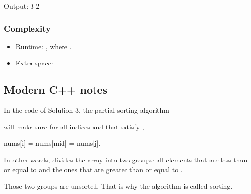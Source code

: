 \documentclass[letterpaper,12pt,english]{book}
\begin{document}
\begin{sphinxVerbatim}[commandchars=\\\{\}]
Output:
3
2
\end{sphinxVerbatim}


\subsubsection{Complexity}
\label{\detokenize{Sorting/04_SORT_169_Majority_Element:id3}}\begin{itemize}
\item {} 
\sphinxAtStartPar
Runtime: , where .

\item {} 
\sphinxAtStartPar
Extra space: .

\end{itemize}


\subsection{Modern C++ notes}
\label{\detokenize{Sorting/04_SORT_169_Majority_Element:modern-c-notes}}
\sphinxAtStartPar
In the code of Solution 3, the partial sorting algorithm %
\begin{footnote}[80]\sphinxAtStartFootnote
{}
%
\end{footnote} will make sure for all indices  and  that satisfy ,

\begin{sphinxVerbatim}[commandchars=\\\{\}]
nums[i] \PYGZlt{}= nums[mid] \PYGZlt{}= nums[j].
\end{sphinxVerbatim}

\sphinxAtStartPar
In other words,  divides the array  into two groups: all elements that are less than or equal to  and the ones that are greater than or equal to .

\sphinxAtStartPar
Those two groups are unsorted. That is why the algorithm is called  sorting.
\end{document}
